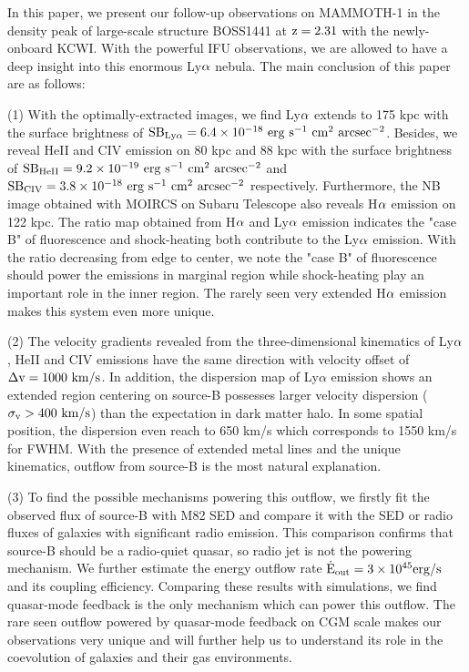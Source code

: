 \documentclass[../main.tex]{subfiles}
\begin{document}
In this paper, we present our follow-up observations on MAMMOTH-1 in the density peak of large-scale structure BOSS1441 at $\rm z=2.31$ with the newly-onboard KCWI. With the powerful IFU observations, we are allowed to have a deep insight into this enormous Ly$\rm \alpha$ nebula. The main conclusion of this paper are as follows:

(1) With the optimally-extracted images, we find Ly$\rm \alpha$ extends to 175 kpc with the surface brightness of $\rm SB_{Ly\alpha}= 6.4 \times 10^{-18} \ erg \ s^{-1} \ cm^{2} \ arcsec^{-2}$. Besides, we reveal HeII and CIV emission on 80 kpc and 88 kpc with the surface brightness of $\rm SB_{HeII}=9.2 \times 10^{-19} \ erg \ s^{-1} \ cm^{2} \ arcsec^{-2}$ and $\rm SB_{CIV}=3.8 \times 10^{-18} \ erg \ s^{-1} \ cm^{2} \ arcsec^{-2}$ respectively. Furthermore, the NB image obtained with MOIRCS on Subaru Telescope also reveals H$\rm \alpha$ emission on 122 kpc. The ratio map obtained from H$\rm \alpha$ and Ly$\rm \alpha$ emission indicates the "case B" of fluorescence and shock-heating both contribute to the Ly$\rm \alpha$ emission. With the ratio decreasing from edge to center, we note the "case B" of fluorescence should power the emissions in marginal region while shock-heating play an important role in the inner region. The rarely seen very extended H$\rm \alpha$ emission makes this system even more unique.

(2) The velocity gradients revealed from the three-dimensional kinematics of Ly$\rm \alpha$, HeII and CIV emissions have the same direction with velocity offset of $\rm \Delta v=1000 \ km/s$. In addition, the dispersion map of Ly$\alpha$ emission shows an extended region centering on source-B possesses larger velocity dispersion ($\rm \sigma_{v}> 400 \ km/s$) than the expectation in dark matter halo. In some spatial position, the dispersion even reach to 650 km/s which corresponds to 1550 km/s for FWHM. With the presence of extended metal lines and the unique kinematics, outflow from source-B is the most natural explanation.

(3) To find the possible mechanisms powering this outflow, we firstly fit the observed flux of source-B with M82 SED and compare it with the SED or radio fluxes of galaxies with significant radio emission. This comparison confirms that source-B should be a radio-quiet quasar, so radio jet is not the powering mechanism. We further estimate the energy outflow rate $\rm \dot{E}_{out}=3 \times 10^{45} erg/s$ and its coupling efficiency. Comparing these results with simulations, we find quasar-mode feedback is the only mechanism which can power this outflow. The rare seen outflow powered by quasar-mode feedback on CGM scale makes our observations very unique and will further help us to understand its role in the coevolution of galaxies and their gas environments.
\end{document}
